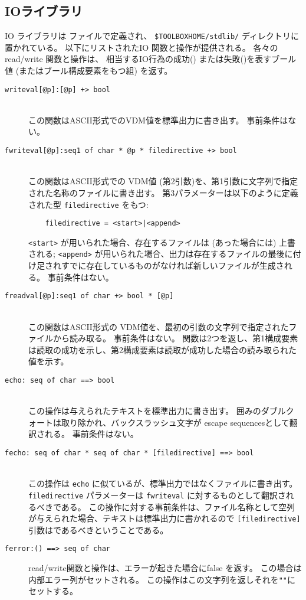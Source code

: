 \documentclass[\pformat,12pt]{jarticle}
\begin{document}
\subsection{IOライブラリ}

 IO ライブラリは ファイルで定義され、 \verb+$TOOLBOXHOME/stdlib/+ ディレクトリに置かれている。
以下にリストされたIO 関数と操作が提供される。
各々の read/write 関数と操作は、 相当するIO行為の成功() または失敗()を表すブール値 (またはブール構成要素をもつ組) を返す。

\begin{description}
\item[\texttt{writeval[@p]:[@p] +> bool}] \mbox{}\\
  この関数はASCII形式でのVDM値を標準出力に書き出す。
 事前条件はない。
\item[\texttt{fwriteval[@p]:seq1 of char * @p * filedirective +>
    bool}] \mbox{}\\
 この関数はASCII形式での VDM値 (第2引数)を、第1引数に文字列で指定された名称のファイルに書き出す。 
第3パラメーターは以下のように定義された型 \texttt{filedirective} をもつ:
  \begin{verbatim}
    filedirective = <start>|<append> 
  \end{verbatim}
  \texttt{<start>} が用いられた場合、存在するファイルは (あった場合には) 上書される; \texttt{<append>} が用いられた場合、出力は存在するファイルの最後に付け足されすでに存在しているものがなければ新しいファイルが生成される。 
事前条件はない。
\item[\texttt{freadval[@p]:seq1 of char +> bool * [@p]}] \mbox{}\\
この関数はASCII形式の VDM値を、最初の引数の文字列で指定されたファイルから読み取る。
事前条件はない。
関数は2つを返し、第1構成要素は読取の成功を示し、第2構成要素は読取が成功した場合の読み取られた値を示す。
\item[\texttt{echo: seq of char ==> bool}] \mbox{}\\
  この操作は与えられたテキストを標準出力に書き出す。
囲みのダブルクォートは取り除かれ、バックスラッシュ文字が \hypertarget{rule:escape sequence}{escape sequences}として翻訳される。
事前条件はない。
\item[\texttt{fecho: seq of char * seq of char * [filedirective] ==> bool}]
  \mbox{}\\
 この操作は \texttt{echo} に似ているが、標準出力ではなくファイルに書き出す。 
 \texttt{filedirective} パラメーターは \texttt{fwriteval} に対するものとして翻訳されるべきである。 
この操作に対する事前条件は、ファイル名称として空列が与えられた場合、テキストは標準出力に書かれるので \texttt{[filedirective]}引数はであるべきということである。 
\item[\texttt{ferror:()  ==> seq of char}]
  read/write関数と操作は、エラーが起きた場合にfalse を返す。
この場合は内部エラー列がセットされる。 
この操作はこの文字列を返しそれを\texttt{""}にセットする。
\end{description}
\end{document}
